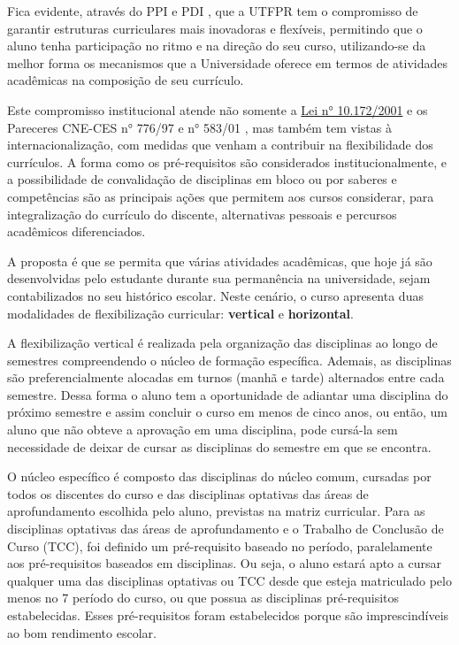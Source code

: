 Fica evidente, através do PPI \cite{ppiutfpr} e PDI \cite{pdiutfpr}, que a UTFPR tem o compromisso de garantir estruturas curriculares mais inovadoras e flexíveis, permitindo que o aluno tenha participação no ritmo e na direção do seu curso, utilizando-se da melhor forma os mecanismos que a Universidade oferece em termos de atividades acadêmicas na composição de seu currículo.

Este compromisso institucional atende não somente a \href{http://www.planalto.gov.br/ccivil_03/leis/leis_2001/l10172.htm}{Lei n° 10.172/2001} \cite{Lei:10172:2001} e os Pareceres CNE-CES n° 776/97 \cite{parecer776} e n° 583/01 \cite{parecer583}, mas também tem vistas à internacionalização, com medidas que venham a contribuir na flexibilidade dos currículos. A forma como os pré-requisitos são considerados institucionalmente, e a possibilidade de convalidação de disciplinas em bloco ou por saberes e competências são as principais ações que permitem aos cursos considerar, para integralização do currículo do discente, alternativas pessoais e percursos acadêmicos diferenciados.

A proposta é que se permita que várias atividades acadêmicas, que hoje já são desenvolvidas pelo estudante durante sua permanência na universidade, sejam contabilizados no seu histórico escolar. Neste cenário, o curso apresenta duas modalidades de flexibilização curricular: \textbf{vertical} e \textbf{horizontal}. 

A flexibilização vertical é realizada pela organização das disciplinas ao longo de semestres compreendendo o núcleo de formação específica. Ademais, as disciplinas são preferencialmente alocadas em turnos (manhã e tarde) alternados entre cada semestre. Dessa forma o aluno tem a oportunidade de adiantar uma disciplina do próximo semestre e assim concluir o curso em menos de cinco anos, ou então, um aluno que não obteve a aprovação em uma disciplina, pode cursá-la sem necessidade de deixar de cursar as disciplinas do semestre em que se encontra.

O núcleo específico é composto das disciplinas do núcleo comum, cursadas por todos os discentes do curso e das disciplinas optativas das áreas de aprofundamento escolhida pelo aluno, previstas na matriz curricular. Para as disciplinas optativas das áreas de aprofundamento e o Trabalho de Conclusão de Curso (TCC), foi definido um pré-requisito baseado no período, paralelamente aos pré-requisitos baseados em disciplinas. Ou seja, o aluno estará apto a cursar qualquer uma das disciplinas optativas ou TCC desde que esteja matriculado pelo menos no 7\textordmasculine{} período do curso, ou que possua as disciplinas pré-requisitos estabelecidas. Esses pré-requisitos foram estabelecidos porque são imprescindíveis ao bom rendimento escolar.

